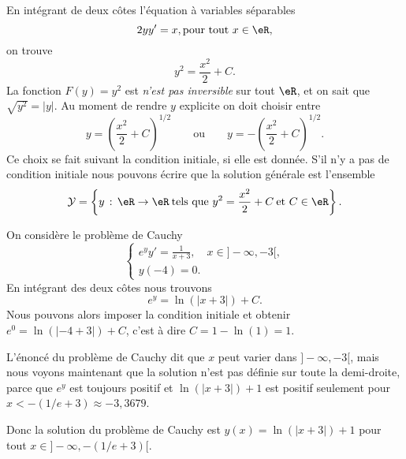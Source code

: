 \begin{example}
  En intégrant de deux côtes l'équation à variables séparables
  \begin{equation}
    2y y' = x, \text{pour tout } x\in\eR,
  \end{equation}
  on trouve
  \[
  y^2 = \frac{x^2}{2} + C .
  \]
La fonction $F(y) = y^2$ est \emph{n'est pas inversible} sur tout $\eR$, et on sait que \(\sqrt{y^2} = |y|\).  Au moment de rendre $y$ explicite on doit choisir entre
\[
y = \left(\frac{x^2}{2} + C \right)^{1/2}\qquad \text{ou}\qquad y = -\left(\frac{x^2}{2} + C \right)^{1/2} .
\]
Ce choix se fait suivant la condition initiale, si elle est donnée. S'il n'y a pas de condition initiale nous pouvons écrire que la solution générale est l'ensemble
\[
\mathcal{Y} =\left\{ y \,:\, \eR \to \eR\:\text{tels que }  y^2 = \frac{x^2}{2} + C \:\text{et } C\in\eR\right\}.
\]
\end{example}

\begin{example}
  On considère le problème de Cauchy
  \begin{equation}
    \begin{cases}
      e^y y' = \frac{1}{x+3}, \quad x\in ]-\infty, -3[,\\
      y(-4) = 0.
    \end{cases}
  \end{equation}
En intégrant des deux côtes nous trouvons
\[
e^y = \ln(|x+3|) +C.
\]
Nous pouvons alors imposer la condition initiale et obtenir $e^{0} =\ln(|-4+3|) +C $, c'est \`a dire $C = 1- \ln(1) = 1$.
\begin{remark}
  L'énoncé du problème de Cauchy dit que $x$ peut varier dans \(]-\infty, -3[\), mais nous voyons maintenant que la solution n'est pas définie sur toute la demi-droite, parce que $e^y$ est toujours positif  et $\ln(|x+3|) +1$ est positif seulement pour $x < -(1/e + 3)\approx -3,3679$.
\end{remark}
Donc la solution du problème de Cauchy est \(y(x) = \ln(|x+3|) +1\) pour tout $x\in ]-\infty, -(1/e +3)[$.
\end{example}

